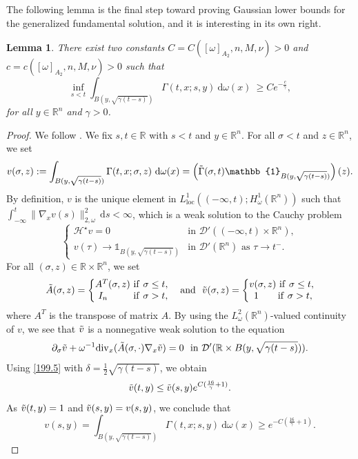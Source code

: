 \documentclass[12pt, letterpaper]{amsart}
\newtheorem{lem}[thm]{Lemma}
\theoremstyle{definition}
\theoremstyle{remark}
\numberwithin{equation}{section}
\begin{document}
The following lemma is the final step toward proving Gaussian lower bounds for the generalized fundamental solution, and it is interesting in its own right.
\begin{lem}\label{lem:GLB-SFG}
    There exist two constants $C=C([ \omega  ]_{A_2},n,M,\nu)>0$ and $c=c([ \omega  ]_{A_2},n,M,\nu)>0$ such that
    \begin{equation*}
        \inf_{s<t} \int_{B(y,\sqrt{\gamma(t-s)})} \Gamma(t,x;s,y) \ \mathrm{d}\omega(x) \ \ge C e^{-\frac{c}{\gamma}},
    \end{equation*}
    for all $y\in\mathbb{R}^n$ and $\gamma>0$.
\end{lem}
\begin{proof}
    We follow \cite{aronson1967bounds}. We fix $s,t\in \mathbb{R}$ with $s<t$ and $y\in  \mathbb{R}^n$. For all $\sigma <t$ and $z\in \mathbb{R}^n$, we set 
    $$ v(\sigma,z):= \int_{B(y,\sqrt{\gamma(t-s)})} \Gamma(t,x;\sigma,z) \ \mathrm{d}\omega(x)= \left ( \Tilde{\Gamma}(\sigma,t) \mathbb{1}_{B(y,\sqrt{\gamma(t-s)})} \right )(z). $$
    By definition, $v$ is the unique element in \( L^1_{\mathrm{loc}}((-\infty,t); H^1_\omega(\mathbb{R}^n)) \) such that \( \int_{-\infty}^t \|\nabla_x v(s)\|^2_{2,\omega} \, \mathrm{d}s < \infty \), which is a weak solution to the Cauchy problem
    \[
     \left\{
     \begin{array}{ll}
    \mathcal{H}^\star v = 0 & \text{in } \mathcal{D}'((-\infty,t)\times \mathbb{R}^n), \\
    v(\tau) \to \mathbb{1}_{B(y, \sqrt{\gamma(t-s)})} & \text{in } \mathcal{D'}(\mathbb{R}^n) \text{ as } \tau \to t^-.
    \end{array}
    \right.
    \] 
For all $(\sigma,z)\in \mathbb{R}\times \mathbb{R}^n$, we set 
 \begin{align*}
 \Tilde{A}(\sigma,z)  =\left\{\begin{matrix}
 A^T(\sigma,z) \ \mathrm{if} \ \sigma\leq t, \\ 
 \ I_n \ \ \ \ \  \   \ \  \mathrm{if} \ \sigma> t ,
 \\ 
 \end{matrix}\right. 
\ \ \ \text{and} \ \ 
\Tilde{v}(\sigma,z)    =\left\{\begin{matrix}
v(\sigma,z)  \ \mathrm{if} \ \sigma\leq t, \\ 
 \ 1\ \ \ \ \     \  \mathrm{if} \ \sigma> t ,
 \\ 
 \end{matrix}\right.  
 \end{align*}
 where $A^T$ is the transpose of matrix $A$. By using the $L^2_\omega(\mathbb{R}^n)$-valued continuity of $v$, we see that $\Tilde{v}$ is a nonnegative weak solution to the equation 
 $$ \partial_\sigma \Tilde{v}+\omega^{-1} \mathrm{div}_x( \Tilde{A}(\sigma,\cdot)\nabla_x \Tilde{v})=0 \ \ \text{in} \ \mathcal{D'}(\mathbb{R}\times B(y,\sqrt{\gamma(t-s)})). $$
 Using \eqref{199.5} with $\delta=\frac{1}{2}\sqrt{\gamma(t-s)}$, we obtain
 $$\Tilde{v}(t,y) \leq \Tilde{v}(s,y) e^{C(\frac{16}{\gamma}+1)}.$$
 As $\Tilde{v}(t,y)=1$ and $\Tilde{v}(s,y)=v(s,y)$, we conclude that
 $$ v(s,y)= \int_{B(y,\sqrt{\gamma(t-s)})} \Gamma(t,x;s,y) \ \mathrm{d}\omega(x) \geq e^{-C(\frac{16}{\gamma}+1)}.$$

\end{proof}
\end{document}
